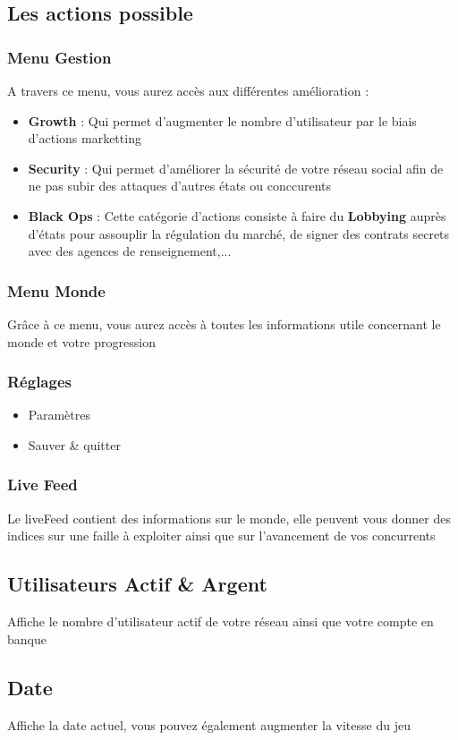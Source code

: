 \subsection{Les actions possible}
\subsubsection{Menu Gestion}
A travers ce menu, vous aurez accès aux différentes amélioration :
\begin{itemize}
            \item \textbf{Growth} : Qui permet d'augmenter le nombre d'utilisateur par le biais d'actions marketting
            \item \textbf{Security} : Qui permet d'améliorer la sécurité de votre réseau social afin de ne pas subir des attaques d'autres états ou conccurents
            \item \textbf{Black Ops} : Cette catégorie d'actions consiste à faire du \textbf{Lobbying} auprès d'états pour assouplir la régulation du marché, de signer des contrats secrets avec des agences de renseignement,...
        \end{itemize}

\subsubsection{Menu Monde}
Grâce à ce menu, vous aurez accès à toutes les informations utile concernant le monde et votre progression

\subsubsection{Réglages}
\begin{itemize}
            \item Paramètres
            \item Sauver \& quitter
\end{itemize}
\subsubsection{Live Feed}
Le liveFeed contient des informations sur le monde, elle peuvent vous donner des indices sur une faille à exploiter ainsi que sur l'avancement de vos concurrents
\subsection{Utilisateurs Actif \& Argent}
Affiche le nombre d'utilisateur actif de votre réseau ainsi que votre compte en banque
\subsection{Date}
Affiche la date actuel, vous pouvez également augmenter la vitesse du jeu


